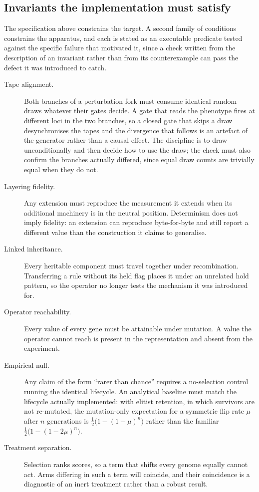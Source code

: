 \documentclass[man,12pt,floatsintext,donotrepeattitle]{apa7}
\begin{document}
\subsection{Invariants the implementation must satisfy}

The specification above constrains the target. A second family of conditions
constrains the apparatus, and each is stated as an executable predicate tested
against the specific failure that motivated it, since a check written from the
description of an invariant rather than from its counterexample can pass the defect
it was introduced to catch.

\begin{description}
\item[Tape alignment.] Both branches of a perturbation fork must consume identical
  random draws whatever their gates decide. A gate that reads the phenotype fires at
  different loci in the two branches, so a closed gate that skips a draw
  desynchronises the tapes and the divergence that follows is an artefact of the
  generator rather than a causal effect. The discipline is to draw unconditionally and
  then decide how to use the draw; the check must also confirm the branches actually
  differed, since equal draw counts are trivially equal when they do not.
\item[Layering fidelity.] Any extension must reproduce the measurement it extends
  when its additional machinery is in the neutral position. Determinism does not imply
  fidelity: an extension can reproduce byte-for-byte and still report a different value
  than the construction it claims to generalise.
\item[Linked inheritance.] Every heritable component must travel together under
  recombination. Transferring a rule without its held flag places it under an
  unrelated hold pattern, so the operator no longer tests the mechanism it was
  introduced for.
\item[Operator reachability.] Every value of every gene must be attainable under
  mutation. A value the operator cannot reach is present in the representation and
  absent from the experiment.
\item[Empirical null.] Any claim of the form ``rarer than chance'' requires a
  no-selection control running the identical lifecycle. An analytical baseline must
  match the lifecycle actually implemented: with elitist retention, in which survivors
  are not re-mutated, the mutation-only expectation for a symmetric flip rate $\mu$
  after $n$ generations is $\tfrac{1}{2}\bigl(1 - (1-\mu)^n\bigr)$ rather than the
  familiar $\tfrac{1}{2}\bigl(1 - (1-2\mu)^n\bigr)$.
\item[Treatment separation.] Selection ranks scores, so a term that shifts every
  genome equally cannot act. Arms differing in such a term will coincide, and their
  coincidence is a diagnostic of an inert treatment rather than a robust result.
\end{description}
\end{document}
